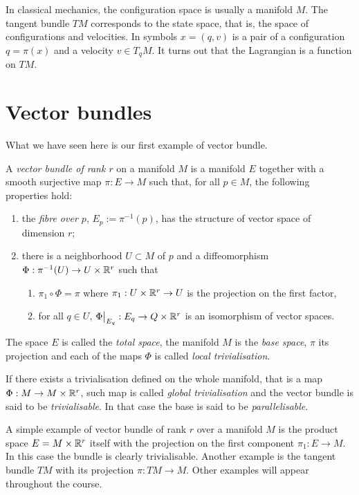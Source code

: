 \begin{remark}
  In classical mechanics, the configuration space is usually a manifold $M$.
  The tangent bundle $TM$ corresponds to the state space, that is, the space of configurations and velocities. In symbols $x=(q,v)$ is a pair of a configuration $q = \pi(x)$ and a velocity $v\in T_q M$.
  It turns out that the Lagrangian is a function on $TM$.
\end{remark}

\section{Vector bundles}

What we have seen here is our first example of vector bundle.

\begin{definition}\label{def:vector_bundle}
  A \emph{vector bundle of rank $r$} on a manifold $M$ is a manifold $E$ together with a smooth surjective map $\pi : E \to M$ such that, for all $p\in M$, the following properties hold:
  \begin{enumerate}
    \item the \emph{fibre over $p$}, $E_p := \pi^{-1}(p)$, has the structure of vector space of dimension $r$;
    \item there is a neighborhood $U\subset M$ of $p$ and a diffeomorphism $\Phi: \pi^{-1}(U) \to U \times \mathbb{R}^r$ such that
    \begin{enumerate}
      \item $\pi_1 \circ \Phi = \pi$ where $\pi_1: U\times\mathbb{R}^r\to U$ is the projection on the first factor,
      \item for all $q\in U$, $\Phi\big|_{E_q} : E_q \to Q\times \mathbb{R}^r$ is an isomorphism of vector spaces.
    \end{enumerate}
  \end{enumerate}

  The space $E$ is called the \emph{total space}, the manifold $M$ is the \emph{base space}, $\pi$ its projection and each of the maps $\Phi$ is called \emph{local trivialisation}.

  If there exists a trivialisation defined on the whole manifold, that is a map $\Phi: M \to M\times \mathbb{R}^r$, such map is called \emph{global trivialisation} and the vector bundle is said to be \emph{trivialisable}. In that case the base is said to be \emph{parallelisable}.
\end{definition}

\begin{example}
  A simple example of vector bundle of rank $r$ over a manifold $M$ is the product space $E = M\times \mathbb{R}^r$ itself with the projection on the first component $\pi_1: E\to M$. In this case the bundle is clearly trivialisable.
  Another example is the tangent bundle $TM$ with its projection $\pi:TM\to M$.
  Other examples will appear throughout the course.
\end{example}

